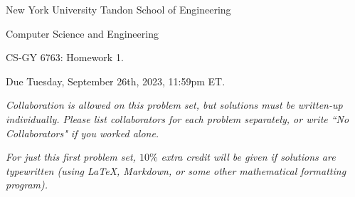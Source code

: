 \documentclass[10pt]{article}
\begin{document}
	
\begin{center}
	\normalsize
	New York University Tandon School of Engineering
	
	Computer Science and Engineering
	\medskip
	
	\large
	CS-GY 6763: Homework 1. 
	
	Due Tuesday, September 26th, 2023, 11:59pm ET.
	\medskip
	
	\normalsize 
	\noindent \emph{Collaboration is allowed on this problem set, but solutions must be written-up individually. Please list collaborators for each problem separately, or write ``No Collaborators" if you worked alone.}
	\medskip
	
	\noindent \emph{For just this first problem set, $10\%$ extra credit will be given if solutions are typewritten (using LaTeX, Markdown, or some other mathematical formatting program).}

\end{center} 
\end{document}

